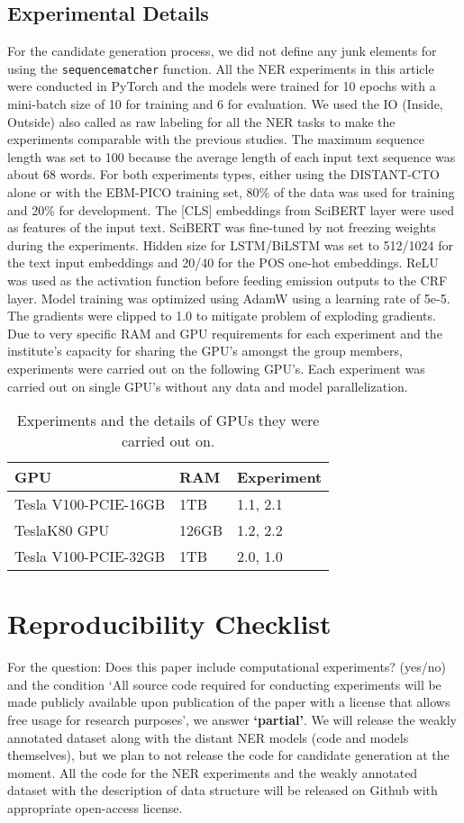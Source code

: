 \documentclass[letterpaper]{article} %
\begin{document}
\subsection{Experimental Details}
\label{app:expdet}
%
For the candidate generation process, we did not define any junk elements for using the {\tt sequencematcher} function.
All the NER experiments in this article were conducted in PyTorch and the models were trained for 10 epochs with a mini-batch size of 10 for training and 6 for evaluation.
We used the IO (Inside, Outside) also called as raw labeling for all the NER tasks to make the experiments comparable with the previous studies.
The maximum sequence length was set to 100 because the average length of each input text sequence was about 68 words.
For both experiments types, either using the DISTANT-CTO alone or with the EBM-PICO training set, 80\% of the data was used for training and 20\% for development.
The [CLS] embeddings from SciBERT layer were used as features of the input text.
SciBERT was fine-tuned by not freezing weights during the experiments.
Hidden size for LSTM/BiLSTM was set to 512/1024 for the text input embeddings and 20/40 for the POS one-hot embeddings.
ReLU was used as the activation function before feeding emission outputs to the CRF layer.
Model training was optimized using AdamW using a learning rate of 5e-5.
The gradients were clipped to 1.0 to mitigate problem of exploding gradients.
Due to very specific RAM and GPU requirements for each experiment and the institute's capacity for sharing the GPU's amongst the group members, experiments were carried out on the following GPU's.
Each experiment was carried out on single GPU's without any data and model parallelization.
%
%
\begin{table}[htp]
\centering
\begin{tabular}{l|l|l}
\hline 
\textbf{GPU} & \textbf{RAM} & \textbf{ Experiment }  \\
\hline
Tesla V100-PCIE-16GB & 1TB  & 1.1, 2.1\\
TeslaK80 GPU & 126GB & 1.2, 2.2\\
Tesla V100-PCIE-32GB & 1TB   & 2.0, 1.0\\
\hline
\end{tabular}
\caption{Experiments and the details of GPUs they were carried out on.}
\label{table:exp_gpu} 
\end{table}
%
%
%
\section{Reproducibility Checklist}
\label{check}
%
For the question: Does this paper include computational experiments? (yes/no) and the condition `All source code required for conducting experiments will be made publicly available upon publication of the paper with a license that allows free usage for research purposes', we answer \textbf{`partial'}.
We will release the weakly annotated dataset along with the distant NER models (code and models themselves), but we plan to not release the code for candidate generation at the moment.
All the code for the NER experiments and the weakly annotated dataset with the description of data structure will be released on Github with appropriate open-access license.
%
%
%
\end{document}

